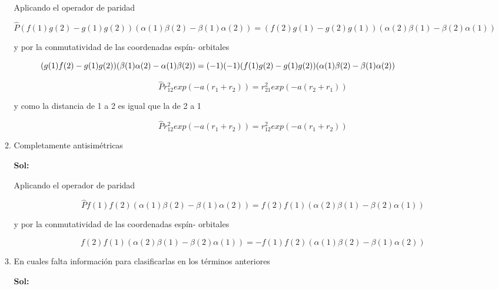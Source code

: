 \documentclass[12pt,a4paper]{article}
\begin{document}
\begin{enumerate}
\begin{enumerate}
    Aplicando el operador de paridad
    
    \begin{equation*}
        \hat{P}(f(1)g(2)-g(1)g(2))(\alpha(1) \beta(2) - \beta(1) \alpha(2)) =(f(2)g(1)-g(2)g(1))(\alpha(2) \beta(1) - \beta(2) \alpha(1))
    \end{equation*}
    
    y por la conmutatividad de las coordenadas espín- orbitales 
    
    \begin{equation*}
        \hspace{-3cm}(g(1)f(2)-g(1)g(2))(\beta(1)\alpha(2)  - \alpha(1)\beta(2) ) =(-1)(-1)(f(1)g(2)-g(1)g(2))(\alpha(1) \beta(2) - \beta(1) \alpha(2))
    \end{equation*}
    
    
    \begin{equation*}
        \hat{P}r_{12}^{2} exp(-a(r_1 + r_2)) = r_{21}^{2} exp(-a(r_2 + r_1))
    \end{equation*}
    
    y como la distancia de 1 a 2 es igual que la de 2 a 1
    
    \begin{equation*}
        \hat{P}r_{12}^{2} exp(-a(r_1 + r_2)) = r_{12}^{2} exp(-a(r_1 + r_2))
    \end{equation*}
    
    \item Completamente antisimétricas
    
    \textbf{Sol:}
    
    Aplicando el operador de paridad
    
    \begin{equation*}
        \hat{P}f(1)f(2)(\alpha (1)\beta(2)-\beta(1)\alpha(2))= f(2)f(1)(\alpha (2)\beta(1)-\beta(2)\alpha(1))
    \end{equation*}
    
    y por la conmutatividad de las coordenadas espín- orbitales 
    
    \begin{equation*}
        f(2)f(1)(\alpha (2)\beta(1)-\beta(2)\alpha(1)) = -f(1)f(2)(\alpha(1)\beta(2)-\beta(1)\alpha (2))
    \end{equation*}
    
    \item En cuales falta información para clasificarlas en los términos anteriores
    
    \textbf{Sol:}
    

\end{enumerate}
\end{enumerate}
\end{document}
